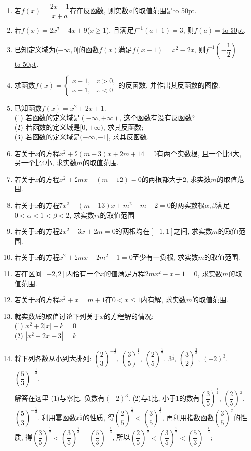 \documentclass[10pt,a4paper]{article}
\newcommand{\blank}[1]{\underline{\hbox to #1pt{}}}
\begin{document}
\begin{enumerate}[1.]
\item 若$f(x)=\dfrac{2x-1}{x+a}$存在反函数, 则实数$a$的取值范围是\blank{50}.
\item 若$f(x)=2x^2-4x+9$($x\ge 1$), 且满足$f^{-1}(a+1)=3$, 则$f(a)=$\blank{50}.
\item 已知定义域为$(-\infty ,0]$的函数$f(x)$满足$f(x-1)=x^2-2x$, 则$f^{-1}(-\dfrac 12)=$\blank{50}.
\item 求函数$f(x)=\begin{cases}
   x+1, &  x>0,  \\ x-1, &  x<0  \end{cases}$的反函数, 并作出其反函数的图像.
\item 已知函数$f(x)=x^2+2x+1$.\\
(1) 若函数的定义域是$(-\infty ,+\infty)$, 这个函数有没有反函数?\\
(2) 若函数的定义域是$[0,+\infty)$, 求其反函数;\\
(3) 若函数的定义域是$(-\infty ,-1]$, 求其反函数.
\item 若关于$x$的方程$x^2+2(m+3)x+2m+14=0$有两个实数根, 且一个比$4$大, 另一个比$4$小, 求实数$m$的取值范围.
\item 若关于$x$的方程$x^2+2mx-(m-12)=0$的两根都大于$2$, 求实数$m$的取值范围.
\item 若关于$x$的方程$7x^2-(m+13)x+m^2-m-2=0$的两实数根$\alpha ,\beta$满足$0<\alpha <1<\beta <2$, 求实数$m$的取值范围.
\item 若关于$x$的方程$2x^2-3x+2m=0$的两根均在$[-1, 1]$之间, 求实数$m$的取值范围.
\item 若关于$x$的方程$x^2+2mx+2m^2-1=0$至少有一负根, 求实数$m$的取值范围.
\item 若在区间$[-2, 2]$内恰有一个$x$的值满足方程$2mx^2-x-1=0$, 求实数$m$的取值范围.
\item 若关于$x$的方程$x^2+x=m+1$在$0<x\le 1$内有解, 求实数$m$的取值范围.
\item 就实数$k$的取值讨论下列关于$x$的方程解的情况:\\
(1) $x^2+2|x|-k=0$;\\
(2) $|x^2-2x-3|=k$.
\item 将下列各数从小到大排列: $(\dfrac 23)^{-\frac 13}$, $(\dfrac 35)^{\frac 12}$, $(\dfrac 25)^{\frac 12}$, $3^{\frac 13}$, $(\dfrac 32)^{\frac 23}$, $(-2)^3$, $(\dfrac 53)^{-\frac 13}$.\\
解答在这里  (1)与零比, 负数有$(-2)^3$.
(2)与$1$比, 小于$1$的数有$(\dfrac 35)^{\frac 12}$, $(\dfrac 25)^{\frac 12}$, $(\dfrac 53)^{-\frac 13}$.
利用幂函数$x^{\frac 12}$的性质, 得$(\dfrac 25)^{\frac 12}<(\dfrac 35)^{\frac 12}$, 再利用指数函数$(\dfrac 35)^x$的性质, 得$(\dfrac 35)^{\frac 12}<(\dfrac 35)^{\frac 13}=(\dfrac 53)^{-\frac 13}$, 所以$(\dfrac 25)^{\frac 12}<(\dfrac 35)^{\frac 12}<(\dfrac 53)^{-\frac 13}$;

\end{enumerate}
\end{document}
